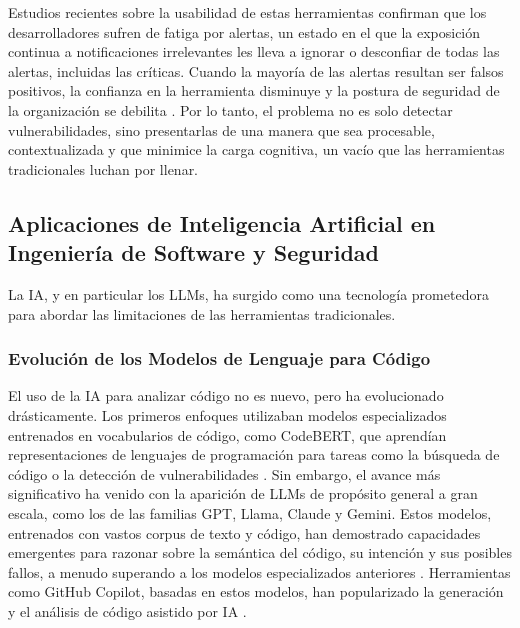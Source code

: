 Estudios recientes sobre la usabilidad de estas herramientas confirman que los desarrolladores sufren de fatiga por alertas, un estado en el que la exposición continua a notificaciones irrelevantes les lleva a ignorar o desconfiar de todas las alertas, incluidas las críticas. Cuando la mayoría de las alertas resultan ser falsos positivos, la confianza en la herramienta disminuye y la postura de seguridad de la organización se debilita \cite{Johnson2023UsabilitySAST}. Por lo tanto, el problema no es solo detectar vulnerabilidades, sino presentarlas de una manera que sea procesable, contextualizada y que minimice la carga cognitiva, un vacío que las herramientas tradicionales luchan por llenar.

\subsection{Aplicaciones de Inteligencia Artificial en Ingeniería de Software y Seguridad}
La IA, y en particular los LLMs, ha surgido como una tecnología prometedora para abordar las limitaciones de las herramientas tradicionales.

\subsubsection{Evolución de los Modelos de Lenguaje para Código}
El uso de la IA para analizar código no es nuevo, pero ha evolucionado drásticamente. Los primeros enfoques utilizaban modelos especializados entrenados en vocabularios de código, como CodeBERT, que aprendían representaciones de lenguajes de programación para tareas como la búsqueda de código o la detección de vulnerabilidades \cite{Chen2020CodeBERT}. Sin embargo, el avance más significativo ha venido con la aparición de LLMs de propósito general a gran escala, como los de las familias GPT, Llama, Claude y Gemini. Estos modelos, entrenados con vastos corpus de texto y código, han demostrado capacidades emergentes para razonar sobre la semántica del código, su intención y sus posibles fallos, a menudo superando a los modelos especializados anteriores \cite{Siddiq2024LLMSurvey}. Herramientas como GitHub Copilot, basadas en estos modelos, han popularizado la generación y el análisis de código asistido por IA \cite{GitHubCopilotFeatures, Wang2022CopilotSecurity}.


